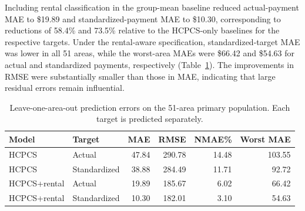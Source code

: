 Including rental classification in the group-mean baseline reduced actual-payment MAE to \$19.89 and standardized-payment MAE to \$10.30, corresponding to reductions of 58.4\% and 73.5\% relative to the HCPCS-only baselines for the respective targets. Under the rental-aware specification, standardized-target MAE was lower in all 51 areas, while the worst-area MAEs were \$66.42 and \$54.63 for actual and standardized payments, respectively (Table~\ref{tab:models}). The improvements in RMSE were substantially smaller than those in MAE, indicating that large residual errors remain influential.
\begin{table}[!htbp]\centering\small
\caption{Leave-one-area-out prediction errors on the 51-area primary population. Each target is predicted separately.}\label{tab:models}
\begin{tabular}{llrrrr}\toprule
Model & Target & MAE & RMSE & NMAE\% & Worst MAE\\\midrule
HCPCS & Actual & 47.84 & 290.78 & 14.48 & 103.55\\
HCPCS & Standardized & 38.88 & 284.49 & 11.71 & 92.72\\
HCPCS+rental & Actual & 19.89 & 185.67 & 6.02 & 66.42\\
HCPCS+rental & Standardized & 10.30 & 182.01 & 3.10 & 54.63\\
\bottomrule\end{tabular}\end{table}
